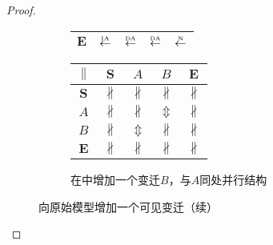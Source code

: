 \begin{proof}
\begin{figure}[htbp]
\begin{subfigure}{1\textwidth}
\begin{minipage}[b]{0.3\textwidth}
\begin{tabular}{|c|c|c|c|c|}
        $\bm{E}$ & $\overset{\text{\tiny{IA}}}{\leftarrow}$ & $\overset{\text{\tiny{DA}}}{\leftarrow}$ & $\overset{\text{\tiny{DA}}}{\leftarrow}$ & $\overset{\text{\tiny{N}}}{\leftarrow}$\\ \hline
      \end{tabular}
    \end{minipage}
    \begin{minipage}[b]{0.3\textwidth}
      \vspace{1em}
      \centering
      \begin{tabular}{|c|c|c|c|c|} \hline
        $\parallel$ & $\bm{S}$ & $A$ & $B$ & $\bm{E}$\\ \hline
        $\bm{S}$ & $\nparallel$ & $\nparallel$ & $\nparallel$ & $\nparallel$\\ \hline
        $A$ & $\nparallel$ & $\nparallel$ & $\Updownarrow$ & $\nparallel$\\ \hline
        $B$ & $\nparallel$ & $\Updownarrow$ & $\nparallel$ & $\nparallel$\\ \hline
        $\bm{E}$ & $\nparallel$ & $\nparallel$ & $\nparallel$ & $\nparallel$\\ \hline
      \end{tabular}
    \end{minipage}
    \caption{在中增加一个变迁$B$，与$A$同处并行结构}
    \label{fig:uniqueness_2_f}
  \end{subfigure}


  \caption{向原始模型增加一个可见变迁（续）}
  \label{fig:uniqueness_2}
\end{figure}

\begin{figure}[htbp]
  \centering


\end{figure}
\end{proof}
